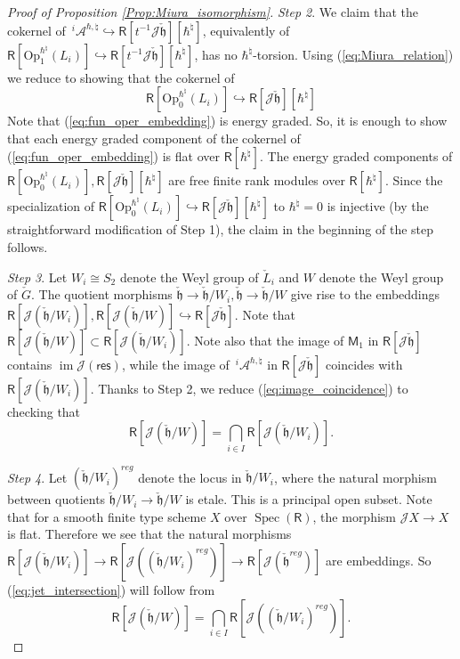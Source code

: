 \documentclass{amsart}
\theoremstyle{definition}
\newcommand{\on}{\mathrm}
\newcommand{\Ring}{\mathsf{R}}
\newcommand{\h}{\mathfrak{h}}
\newcommand{\A}{\mathscr{A}}
\newcommand{\Jet}{\mathscr{J}}
\newcommand{\Op}{\on{Op}}
\numberwithin{equation}{section}
\begin{document}
\begin{proof}[Proof of Proposition \ref{Prop:Miura_isomorphism}]
{\it Step 2}.  
We claim that the cokernel of $\,^i\!\A^{\hbar,\natural}\hookrightarrow \Ring[t^{-1}\Jet\check{\h}][\hbar^\natural]$, equivalently of $\Ring[\Op_1^{\hbar^\natural}(L_i)]\hookrightarrow \Ring[t^{-1}\Jet\check{\h}][\hbar^\natural]$, has no $\hbar^\natural$-torsion. Using (\ref{eq:Miura_relation}) we reduce to showing that the cokernel of 
\begin{equation}\label{eq:fun_oper_embedding}
\Ring[\Op_0^{\hbar^\natural}(L_i)]\hookrightarrow \Ring[\Jet\check{\h}][\hbar^\natural]\end{equation}
Note that (\ref{eq:fun_oper_embedding}) is energy graded.
So, it is enough to show that each energy graded component of the cokernel of (\ref{eq:fun_oper_embedding}) is flat over $\Ring[\hbar^\natural]$. The energy graded components  of $\Ring[\Op_0^{\hbar^\natural}(L_i)], \Ring[\Jet\check{\h}][\hbar^\natural]$ are free finite rank modules over $\Ring[\hbar^\natural]$. Since the specialization of $\Ring[\Op_0^{\hbar^\natural}(L_i)]\hookrightarrow \Ring[\Jet\check{\h}][\hbar^\natural]$ to $\hbar^\natural=0$ is injective (by the straightforward modification of Step 1), the claim in the beginning of the step follows. 





{\it Step 3}. Let $W_i\cong S_2$ denote the Weyl group of $\check{L}_i$
and $W$ denote the Weyl group of $\check{G}$. The quotient morphisms $\check{\h}\rightarrow \check{\h}/W_i, \check{\h}\rightarrow \check{\h}/W$ give rise to the embeddings $\Ring[\Jet(\check{\h}/W_i)],\Ring[\Jet(\check{\h}/W)]\hookrightarrow \Ring[\Jet\check{\h}]$. Note that $\Ring[\Jet(\check{\h}/W)]\subset \Ring[\Jet(\check{\h}/W_i)]$.
Note also that the image of $\mathsf{M}_1$ in $\Ring[\Jet \check{\h}]$   
contains
$\operatorname{im}\Jet(\mathsf{res})$, while the image of $\,^i\!\A^{\hbar,\natural}$ in $\Ring[\Jet\check{\h}]$
coincides with
$\Ring[\Jet(\check{\h}/W_i)]$.
Thanks to Step 2, we reduce (\ref{eq:image_coincidence}) to checking that 
\begin{equation}\label{eq:jet_intersection}
\Ring[\Jet(\check{\h}/W)]=\bigcap_{i\in I}\Ring[\Jet(\check{\h}/W_i)].
\end{equation}

{\it Step 4}. Let $(\check{\h}/W_i)^{reg}$ denote the locus in $\check{\h}/W_i$, where the natural morphism between quotients 
$\check{\h}/W_i\rightarrow \check{\h}/W$ is etale. This is a principal open subset. Note that for a smooth finite type scheme $X$ over $\operatorname{Spec}(\Ring)$, the morphism $\Jet X\rightarrow X$ is flat. 
Therefore we see that the natural morphisms 
$\Ring[\Jet(\check{\h}/W_i)]\rightarrow \Ring[\Jet\left((\check{\h}/W_i)^{reg}\right)]\rightarrow 
\Ring[\Jet(\check{\h}^{reg})]$ are embeddings. So (\ref{eq:jet_intersection}) 
will follow from
\begin{equation}\label{eq:jet_intersection_reg}
\Ring[\Jet(\check{\h}/W)]=\bigcap_{i\in I}\Ring[\Jet\left((\check{\h}/W_i)^{reg}\right)].
\end{equation}


\end{proof}
\end{document}
